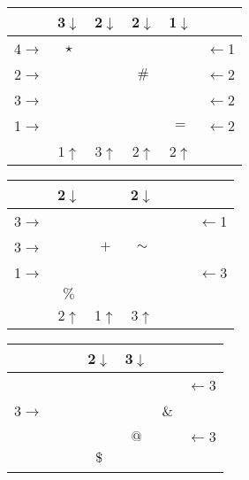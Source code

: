 \begin{puzzle}
\vfill

\newpage

\begin{multicols}{2}
\begin{center}
\begin{tabular}{c||c|c|c|c||c}
  & 3\(\downarrow\)         & 2\(\downarrow\)         & 2\(\downarrow\)         & 1\(\downarrow\)         &   \\\hline\hline
4\(\rightarrow\) & \(\star\) &           &           &           & \(\leftarrow\)1 \\\hline
2\(\rightarrow\) &           &           & \(\#\)    &           & \(\leftarrow\)2 \\\hline
3\(\rightarrow\) &           &           &           &           & \(\leftarrow\)2 \\\hline
1\(\rightarrow\) &           &           &           & \(=\)     & \(\leftarrow\)2 \\\hline\hline
  & 1\(\uparrow\)         & 3\(\uparrow\)         & 2\(\uparrow\)         & 2\(\uparrow\)         &
\end{tabular}

\begin{tabular}{c||c|c|c|c||c}
  & 2\(\downarrow\)         &           & 2\(\downarrow\)         & ~~        &   \\\hline\hline
3\(\rightarrow\) &           &           &           &           & \(\leftarrow\)1 \\\hline
3\(\rightarrow\) &           & \(+\)     & \(\sim\)  &           &   \\\hline
1\(\rightarrow\) &           &           &           &           & \(\leftarrow\)3 \\\hline
  & \(\%\)    &           &           &           &   \\\hline\hline
  & 2\(\uparrow\)         & 1\(\uparrow\)         & 3\(\uparrow\)         &           &
\end{tabular}
\end{center}

\begin{center}
\begin{tabular}{c||c|c|c|c||c}
  & ~~        & 2\(\downarrow\)         & 3\(\downarrow\)         &           &   \\\hline\hline
  &           &           &           &           & \(\leftarrow\)3 \\\hline
3\(\rightarrow\) &           &           &           & \(\&\)    &   \\\hline
  &           &           & \(@\)     &           & \(\leftarrow\)3 \\\hline
  &           & \(\$\)    &           &           &   \\\hline\hline
  &           &           &           &           &
\end{tabular}


\end{center}
\end{multicols}
\end{puzzle}

